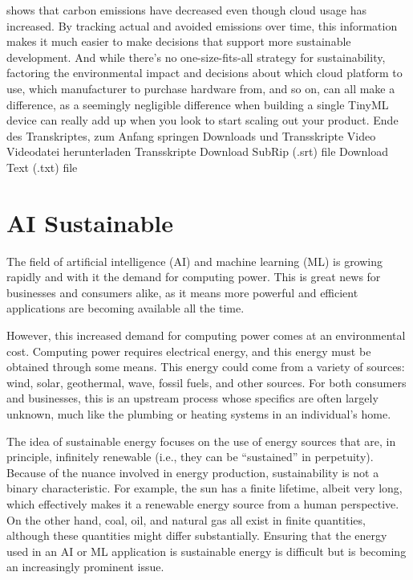 {{{{{{{{    shows that carbon emissions have decreased
    even though cloud usage has increased.
    By tracking actual and avoided emissions over time,
    this information makes it much easier to make decisions that
    support more sustainable development.
    And while there's no one-size-fits-all strategy for sustainability,
    factoring the environmental impact and decisions about which cloud platform
    to use, which manufacturer to purchase hardware from,
    and so on, can all make a difference, as a seemingly negligible difference when
    building a single TinyML device can really add up when you look to start
    scaling out your product.
    Ende des Transkriptes, zum Anfang springen
    Downloads und Transskripte
    Video
    Videodatei herunterladen
    Transskripte
    Download SubRip (.srt) file
    Download Text (.txt) file        
    
    
\section{AI Sustainable}
    
    
    The field of artificial intelligence (AI) and machine learning (ML) is growing rapidly and with it the demand for computing power. This is great news for businesses and consumers alike, as it means more powerful and efficient applications are becoming available all the time.
    
    However, this increased demand for computing power comes at an environmental cost. Computing power requires electrical energy, and this energy must be obtained through some means. This energy could come from a variety of sources: wind, solar, geothermal, wave, fossil fuels, and other sources. For both consumers and businesses, this is an upstream process whose specifics are often largely unknown, much like the plumbing or heating systems in an individual’s home.
    
    The idea of sustainable energy focuses on the use of energy sources that are, in principle, infinitely renewable (i.e., they can be “sustained” in perpetuity). Because of the nuance involved in energy production, sustainability is not a binary characteristic. For example, the sun has a finite lifetime, albeit very long, which effectively makes it a renewable energy source from a human perspective. On the other hand, coal, oil, and natural gas all exist in finite quantities, although these quantities might differ substantially. Ensuring that the energy used in an AI or ML application is sustainable energy is difficult but is becoming an increasingly prominent issue.
    
}}}}}}}}
